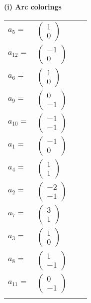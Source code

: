 \documentclass[1p]{elsarticle_modified}
\theoremstyle{definition}
\begin{document}
\flushleft \textbf{(i) Arc colorings}\\
\begin{tabular}{m{7pt} m{180pt} m{7pt} m{180pt} }
\flushright $a_{5}=$&$\begin{pmatrix}1\\0\end{pmatrix}$ \\
\flushright $a_{12}=$&$\begin{pmatrix}-1\\0\end{pmatrix}$ \\
\flushright $a_{6}=$&$\begin{pmatrix}1\\0\end{pmatrix}$ \\
\flushright $a_{9}=$&$\begin{pmatrix}0\\-1\end{pmatrix}$ \\
\flushright $a_{10}=$&$\begin{pmatrix}-1\\-1\end{pmatrix}$ \\
\flushright $a_{1}=$&$\begin{pmatrix}-1\\0\end{pmatrix}$ \\
\flushright $a_{4}=$&$\begin{pmatrix}1\\1\end{pmatrix}$ \\
\flushright $a_{2}=$&$\begin{pmatrix}-2\\-1\end{pmatrix}$ \\
\flushright $a_{7}=$&$\begin{pmatrix}3\\1\end{pmatrix}$ \\
\flushright $a_{3}=$&$\begin{pmatrix}1\\0\end{pmatrix}$ \\
\flushright $a_{8}=$&$\begin{pmatrix}1\\-1\end{pmatrix}$ \\
\flushright $a_{11}=$&$\begin{pmatrix}0\\-1\end{pmatrix}$\\&\end{tabular}
\end{document}
